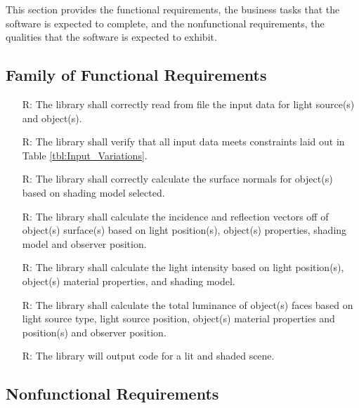 \documentclass[12pt]{article}
\newcounter{reqnum} %
\begin{document}
This section provides the functional requirements, the business tasks that the
software is expected to complete, and the nonfunctional requirements, the
qualities that the software is expected to exhibit.

\subsection{Family of Functional Requirements}

\noindent \begin{itemize}

\item[R\refstepcounter{reqnum}\thereqnum \label{R_Inputs1}:] The library shall  
correctly read from file the input data for light source(s) and object(s).
\item[R\refstepcounter{reqnum}\thereqnum \label{R_Inputs2}:]The library shall 
verify that all input data meets constraints laid out in Table 
\ref{tbl:Input_Variations}.
\item[R\refstepcounter{reqnum}\thereqnum \label{R_Calculate1}:] The library 
shall correctly calculate the surface normals for object(s) based on shading 
model selected. 
\item[R\refstepcounter{reqnum}\thereqnum \label{R_Calculate2}:] The library 
shall calculate the incidence and reflection vectors off of object(s) 
surface(s) based on light position(s), object(s) properties, shading model and 
observer position.
\item[R\refstepcounter{reqnum}\thereqnum \label{R_Calculate3}:] The library 
shall calculate the light intensity based on light position(s), object(s) 
material properties, and shading model.
\item[R\refstepcounter{reqnum}\thereqnum \label{R_Calculate4}:] The library 
shall calculate the total luminance of object(s) faces based on light source 
type, light source position, object(s) material properties and position(s) and 
observer position.
\item[R\refstepcounter{reqnum}\thereqnum \label{R_Output}:] The library 
will output code for a lit and shaded scene.

\end{itemize}


\subsection{Nonfunctional Requirements}
\end{document}

